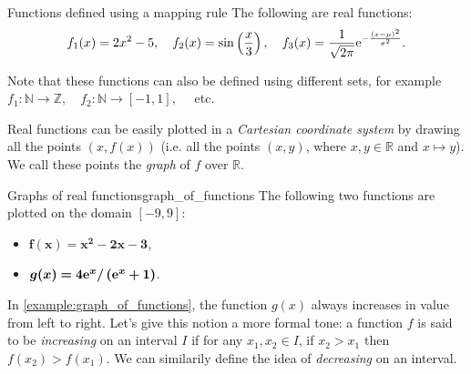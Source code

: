\begin{example}{Functions defined using a mapping rule}{}
	The following are real functions:
	\[
		f_{1}(x) = 2x^{2}-5,\quad f_{2}(x)=\sin\left( \frac{x}{3} \right),\quad f_{3}(x)=\frac{1}{\sqrt{2\pi}}\mathrm{e}^{-\frac{(x-\mu)^{2}}{\sigma^{2}}}.
	\]

	Note that these functions can also be defined using different sets, for example $f_{1}:\mathbb{N}\to\mathbb{Z},\quad f_{2}:\mathbb{N}\to[-1,1],\quad$ etc.
\end{example}

Real functions can be easily plotted in a \emph{Cartesian coordinate system} by drawing all the points $\left( x,f(x) \right)$ (i.e. all the points $\left( x,y \right)$, where $x,y\in\mathbb{R}$ and $x\mapsto y$). We call these points the \emph{graph} of $f$ over $\mathbb{R}$.

\begin{example}{Graphs of real functions}{graph_of_functions}
	The following two functions are plotted on the domain $\left[ -9,9 \right]$:

	\begin{minipage}{0.35\textwidth}
		\begin{itemize}
			\item \textcolor{xred}{$\bm{f(x)=x^{2}-2x-3}$},
			\item \textcolor{xgreen}{$\bm{g(x)=4\mathrm{e}^{x}/\left( \mathrm{e}^{x}+1 \right)}$}.
		\end{itemize}
	\end{minipage}%
	\begin{minipage}[c]{0.65\textwidth}
		\centering
	\end{minipage}
\end{example}

In \autoref{example:graph_of_functions}, the function $g(x)$ always increases in value from left to right. Let's give this notion a more formal tone: a function $f$ is said to be \emph{increasing} on an interval $I$ if for any $x_{1},x_{2}\in I$, if $x_{2}>x_{1}$ then $f\left( x_{2} \right) > f\left( x_{1} \right)$. We can similarily define the idea of \emph{decreasing} on an interval.

